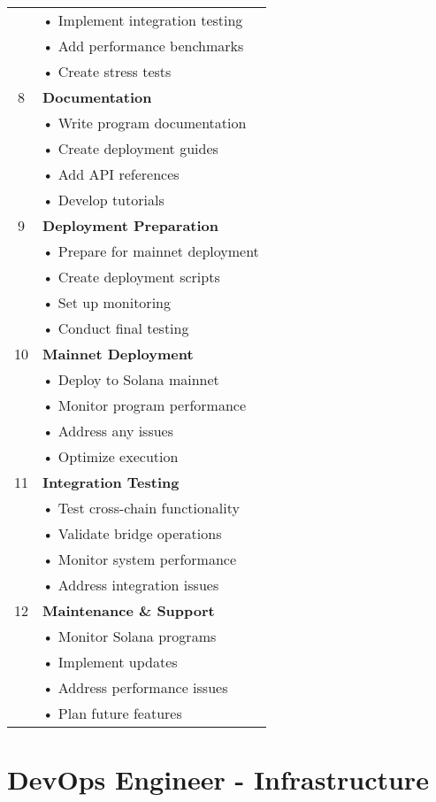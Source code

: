 \documentclass{article}
\begin{document}
\begin{longtable}{|c|p{}|}
& • Implement integration testing\\
& • Add performance benchmarks\\
& • Create stress tests\\
\hline
8 & \textbf{Documentation}\\
& • Write program documentation\\
& • Create deployment guides\\
& • Add API references\\
& • Develop tutorials\\
\hline
9 & \textbf{Deployment Preparation}\\
& • Prepare for mainnet deployment\\
& • Create deployment scripts\\
& • Set up monitoring\\
& • Conduct final testing\\
\hline
10 & \textbf{Mainnet Deployment}\\
& • Deploy to Solana mainnet\\
& • Monitor program performance\\
& • Address any issues\\
& • Optimize execution\\
\hline
11 & \textbf{Integration Testing}\\
& • Test cross-chain functionality\\
& • Validate bridge operations\\
& • Monitor system performance\\
& • Address integration issues\\
\hline
12 & \textbf{Maintenance \& Support}\\
& • Monitor Solana programs\\
& • Implement updates\\
& • Address performance issues\\
& • Plan future features\\
\hline
\end{longtable}

\section*{DevOps Engineer - Infrastructure}
\end{document}
